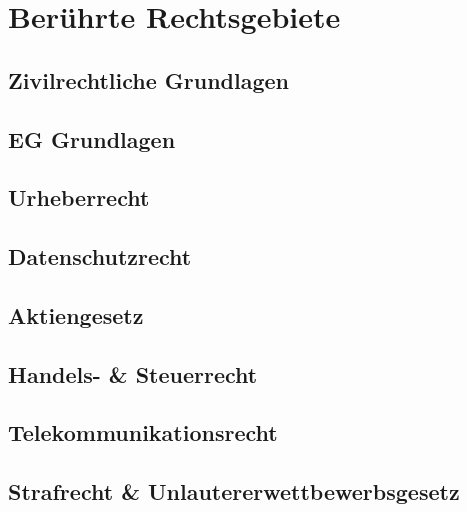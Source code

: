 \chapter{Ber\"uhrte Rechtsgebiete}
\section{Zivilrechtliche Grundlagen}
\section{EG Grundlagen}
\section{Urheberrecht}
\section{Datenschutzrecht}
\section{Aktiengesetz}
\section{Handels- \& Steuerrecht}
\section{Telekommunikationsrecht}
\section{Strafrecht \& Unlautererwettbewerbsgesetz}

  